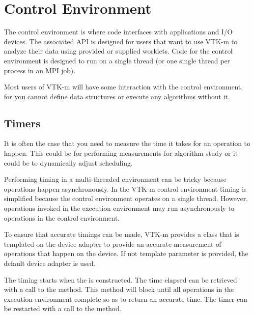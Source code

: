 
\chapter{Control Environment}
\label{chap:ControlEnvironment}


The control environment is where code interfaces with applications and I/O
devices. The associated API is designed for users that want to use VTK-m to
analyze their data using provided or supplied worklets. Code for the
control environment is designed to run on a single thread (or one single
thread per process in an MPI job).

Most users of VTK-m will have some interaction with the control
environment, for you cannot define data structures or execute any
algorithms without it.

\section{Timers}
\label{sec:Timers}


It is often the case that you need to measure the time it takes for an
operation to happen. This could be for performing measurements for
algorithm study or it could be to dynamically adjust scheduling.

Performing timing in a multi-threaded environment can be tricky because
operations happen asynchronously. In the VTK-m control environment timing
is simplified because the control environment operates on a single
thread. However, operations invoked in the execution environment may run
asynchronously to operations in the control environment.

To ensure that accurate timings can be made, VTK-m provides a
 class that is templated on the device adapter to provide
an accurate measurement of operations that happen on the device. If not
template parameter is provided, the default device adapter is used.

The timing starts when the  is constructed. The time
elapsed can be retrieved with a call to the 
method. This method will block until all operations in the execution
environment complete so as to return an accurate time. The timer can be
restarted with a call to the  method.

